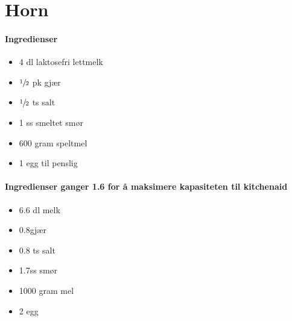 \section{Horn}


\paragraph{Ingredienser}
\begin{itemize}[noitemsep]
	\item 4 dl laktosefri lettmelk
	\item $\sfrac{1}{2}$ pk gjær
	\item  $\sfrac{1}{2}$  ts salt
	\item 1 ss smeltet smør
	\item 600 gram speltmel
	\item 1 egg til penslig
\end{itemize}

\paragraph{Ingredienser ganger 1.6 for å maksimere kapasiteten til kitchenaid}
\begin{itemize}[noitemsep]
	\item 6.6 dl melk
	\item 0.8gjær
	\item 0.8 ts salt
	\item 1.7ss smør
	\item 1000 gram mel
	\item 2 egg
\end{itemize}

